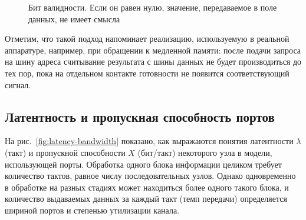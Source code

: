 \begin{figure}[htbp]
    \centering
    \caption[Бит валидности]{Бит валидности. Если он равен нулю, значение, передаваемое в поле данных, не имеет смысла}
    \label{fig:valid}
\end{figure}

Отметим, что такой подход напоминает реализацию, используемую в реальной аппаратуре, например, при обращении к медленной памяти: после подачи запроса на шину адреса считывание результата с шины данных не будет производиться до тех пор, пока на отдельном контакте готовности не появится соответствующий сигнал.

\subsection{Латентность и пропускная способность портов}

На рис.~\ref{fig:latency-bandwidth} показано, как выражаются понятия латентности $\lambda$ (такт) и пропускной способности $X$ (бит/такт) некоторого узла в модели, использующей порты. Обработка одного блока информации целиком требует количество тактов, равное числу последовательных узлов. Однако одновременно в обработке на разных стадиях может находиться более одного такого блока, и количество выдаваемых данных за каждый такт (темп передачи)  определяется шириной портов и степенью утилизации канала.

